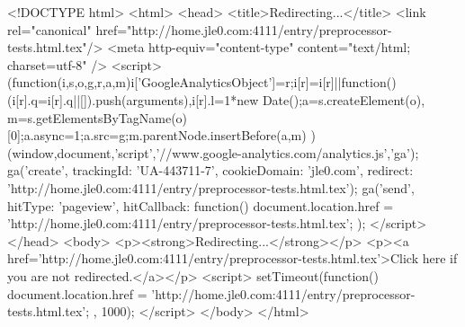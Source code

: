 <!DOCTYPE html>
<html>
<head>
<title>Redirecting...</title>
<link rel="canonical" href="http://home.jle0.com:4111/entry/preprocessor-tests.html.tex"/>
<meta http-equiv="content-type" content="text/html; charset=utf-8" />
<script>
(function(i,s,o,g,r,a,m){i['GoogleAnalyticsObject']=r;i[r]=i[r]||function(){
(i[r].q=i[r].q||[]).push(arguments)},i[r].l=1*new Date();a=s.createElement(o),
m=s.getElementsByTagName(o)[0];a.async=1;a.src=g;m.parentNode.insertBefore(a,m)
})(window,document,'script','//www.google-analytics.com/analytics.js','ga');
ga('create', { trackingId: 'UA-443711-7', cookieDomain: 'jle0.com', redirect: 'http://home.jle0.com:4111/entry/preprocessor-tests.html.tex'});
ga('send', { hitType: 'pageview', hitCallback: function() { document.location.href = 'http://home.jle0.com:4111/entry/preprocessor-tests.html.tex'; } });
</script>
</head>
<body>
  <p><strong>Redirecting...</strong></p>
  <p><a href='http://home.jle0.com:4111/entry/preprocessor-tests.html.tex'>Click here if you are not redirected.</a></p>
  <script>
    setTimeout(function() { document.location.href = 'http://home.jle0.com:4111/entry/preprocessor-tests.html.tex'; }, 1000);
  </script>
</body>
</html>
